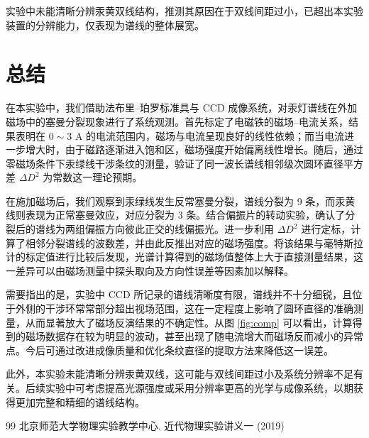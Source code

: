\documentclass[a4paper, 1.5lines]{ctexart}
\begin{document}
实验中未能清晰分辨汞黄双线结构，推测其原因在于双线间距过小，已超出本实验装置的分辨能力，仅表现为谱线的整体展宽。
    \section{总结}
        在本实验中，我们借助法布里--珀罗标准具与 CCD 成像系统，对汞灯谱线在外加磁场中的塞曼分裂现象进行了系统观测。首先标定了电磁铁的磁场--电流关系，结果表明在 \(0\sim 3\) A 的电流范围内，磁场与电流呈现良好的线性依赖；而当电流进一步增大时，由于磁路逐渐进入饱和区，磁场强度开始偏离线性增长。随后，通过零磁场条件下汞绿线干涉条纹的测量，验证了同一波长谱线相邻级次圆环直径平方差 \(\Delta D^2\) 为常数这一理论预期。

在施加磁场后，我们观察到汞绿线发生反常塞曼分裂，谱线分裂为 9 条，而汞黄线则表现为正常塞曼效应，对应分裂为 3 条。结合偏振片的转动实验，确认了分裂后的谱线为两组偏振方向彼此正交的线偏振光。进一步利用 \(\Delta D^2\) 进行定标，计算了相邻分裂谱线的波数差，并由此反推出对应的磁场强度。将该结果与毫特斯拉计的标定值进行比较后发现，光谱计算得到的磁场值整体上大于直接测量结果，这一差异可以由磁场测量中探头取向及方向性误差等因素加以解释。

需要指出的是，实验中 CCD 所记录的谱线清晰度有限，谱线并不十分细锐，且位于外侧的干涉环常常部分超出视场范围，这在一定程度上影响了圆环直径的准确测量，从而显著放大了磁场反演结果的不确定性。从图 \ref{fig:comp} 可以看出，计算得到的磁场数据存在较为明显的波动，甚至出现了随电流增大而磁场反而减小的异常点。今后可通过改进成像质量和优化条纹直径的提取方法来降低这一误差。

此外，本实验未能清晰分辨汞黄双线，这可能与双线间距过小及系统分辨率不足有关。后续实验中可考虑提高光源强度或采用分辨率更高的光学与成像系统，以期获得更加完整和精细的谱线结构。
    \begin{thebibliography}{99}
        北京师范大学物理实验教学中心. 近代物理实验讲义一 (2019)
    \end{thebibliography}

    
\end{document}
